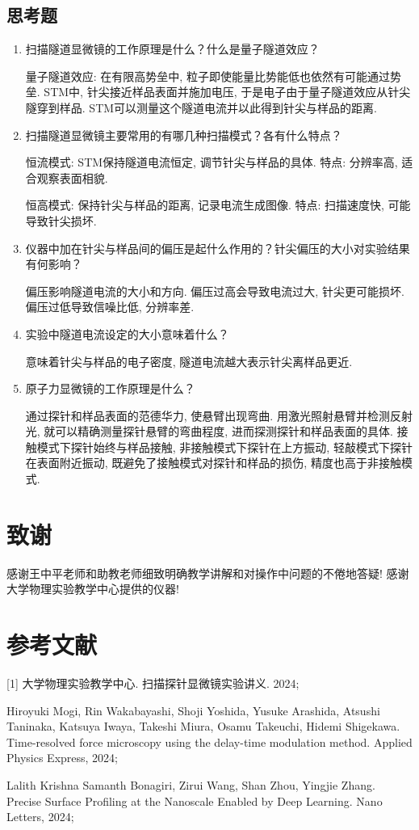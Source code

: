 \documentclass[UTF8]{ctexart}
\begin{document}
\subsection{思考题}
\begin{enumerate}
    \item 扫描隧道显微镜的工作原理是什么？什么是量子隧道效应？\par 量子隧道效应: 在有限高势垒中, 粒子即使能量比势能低也依然有可能通过势垒. STM中, 针尖接近样品表面并施加电压, 于是电子由于量子隧道效应从针尖隧穿到样品. STM可以测量这个隧道电流并以此得到针尖与样品的距离.\\
    \item 扫描隧道显微镜主要常用的有哪几种扫描模式？各有什么特点？\par 恒流模式: STM保持隧道电流恒定, 调节针尖与样品的具体. 特点: 分辨率高, 适合观察表面相貌.\par 恒高模式: 保持针尖与样品的距离, 记录电流生成图像. 特点: 扫描速度快, 可能导致针尖损坏.\\
    \item 仪器中加在针尖与样品间的偏压是起什么作用的？针尖偏压的大小对实验结果有何影响？\par 偏压影响隧道电流的大小和方向. 偏压过高会导致电流过大, 针尖更可能损坏. 偏压过低导致信噪比低, 分辨率差.
    \item 实验中隧道电流设定的大小意味着什么？\par 意味着针尖与样品的电子密度, 隧道电流越大表示针尖离样品更近. 
    \item 原子力显微镜的工作原理是什么？\par 通过探针和样品表面的范德华力, 使悬臂出现弯曲. 用激光照射悬臂并检测反射光, 就可以精确测量探针悬臂的弯曲程度, 进而探测探针和样品表面的具体. 接触模式下探针始终与样品接触, 非接触模式下探针在上方振动, 轻敲模式下探针在表面附近振动, 既避免了接触模式对探针和样品的损伤, 精度也高于非接触模式.
\end{enumerate}
\section{致谢}
感谢王中平老师和助教老师细致明确教学讲解和对操作中问题的不倦地答疑! 感谢大学物理实验教学中心提供的仪器!
\section{参考文献}
[1] 大学物理实验教学中心. 扫描探针显微镜实验讲义. 2024;\par
[2] Hiroyuki Mogi, Rin Wakabayashi, Shoji Yoshida, Yusuke Arashida, Atsushi Taninaka, Katsuya Iwaya, Takeshi Miura, Osamu Takeuchi, Hidemi Shigekawa. Time-resolved force microscopy using the delay-time modulation method. Applied Physics Express, 2024;\par
[3] Lalith Krishna Samanth Bonagiri, Zirui Wang, Shan Zhou, Yingjie Zhang. Precise Surface Profiling at the Nanoscale Enabled by Deep Learning. Nano Letters, 2024;\par
\end{document}
